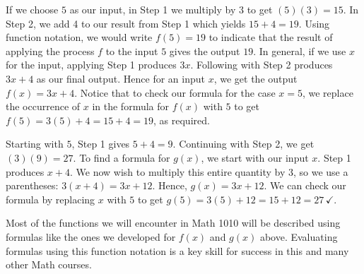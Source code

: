 If we choose $5$ as our input,  in Step 1 we multiply by $3$ to get $(5)(3) = 15$.  In Step 2, we add 4 to our result from Step 1 which yields $15 + 4 = 19$.  Using function notation, we would write  $f(5) = 19$ to indicate that the result of applying the process $f$ to the input $5$ gives the output $19$.  In general, if we use $x$ for the input, applying Step 1 produces $3x$.  Following with Step 2 produces $3x+4$ as our final output.  Hence for an input $x$, we get the output $f(x) = 3x + 4$.  Notice that to check our formula for the case $x=5$, we replace the occurrence of $x$ in the formula for $f(x)$ with $5$ to get $f(5) = 3(5) + 4 = 15 + 4 = 19$, as required.

\medskip

{
Starting with $5$, Step 1 gives $5+4 = 9$.  Continuing with Step 2, we get $(3)(9) = 27$.  To find a formula for $g(x)$, we start with our input $x$.  Step 1 produces $x+4$.  We now wish to multiply this entire quantity by $3$, so we use a parentheses: $3(x+4) = 3x + 12$.  Hence, $g(x) = 3x + 12$.  We can check our formula by replacing $x$ with $5$ to get $g(5) = 3(5) + 12 = 15 + 12 = 27 \, \checkmark$.
}

\medskip

Most of the functions we will encounter in Math 1010 will be described using formulas like the ones we developed for $f(x)$ and $g(x)$ above.  Evaluating formulas using this function notation is a key skill for success in this and many other Math courses.

\pagebreak

